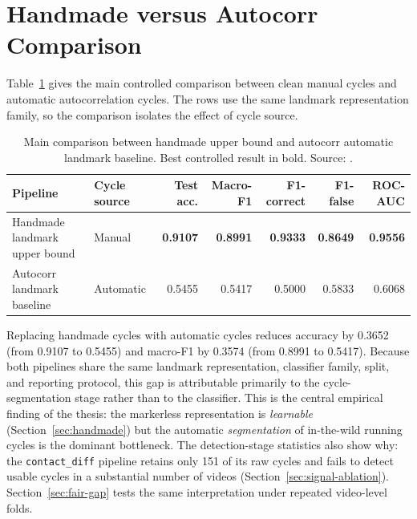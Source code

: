 \section{Handmade versus Autocorr Comparison}
\label{sec:hm-vs-ac}

Table~\ref{tab:hm-ac} gives the main controlled comparison between clean
manual cycles and automatic autocorrelation cycles. The rows use the same
landmark representation family, so the comparison isolates the effect of cycle
source.

\begin{table}[htbp]
\centering
\caption[Main comparison between handmade upper bound and autocorr baseline. Source: \protect{}.]{Main comparison between handmade upper bound and autocorr automatic landmark baseline. Best controlled result in bold. Source: .}
\label{tab:hm-ac}
\small
\begin{tabularx}{\textwidth}{X l r r r r r}
\toprule
\textbf{Pipeline} & \textbf{Cycle source} & \textbf{Test acc.} & \textbf{Macro-F1} & \textbf{F1-correct} & \textbf{F1-false} & \textbf{ROC-AUC} \\
\midrule
Handmade landmark upper bound & Manual & \textbf{0.9107} & \textbf{0.8991} & \textbf{0.9333} & \textbf{0.8649} & \textbf{0.9556} \\
\addlinespace
Autocorr landmark baseline & Automatic & 0.5455 & 0.5417 & 0.5000 & 0.5833 & 0.6068 \\
\bottomrule
\end{tabularx}
\end{table}

Replacing handmade cycles with automatic cycles reduces accuracy by
0.3652 (from 0.9107 to 0.5455) and macro-F1 by 0.3574 (from 0.8991 to 0.5417).
Because both pipelines share the same landmark representation, classifier
family, split, and reporting protocol, this gap is attributable primarily to
the cycle-segmentation stage rather than to the classifier. This is the
central empirical finding of the thesis: the markerless representation is
\emph{learnable} (Section~\ref{sec:handmade}) but the automatic
\emph{segmentation} of in-the-wild running cycles is the dominant bottleneck.
The detection-stage statistics also show why: the
\texttt{contact\_diff} pipeline retains only 151 of its raw cycles and fails
to detect usable cycles in a substantial number of videos
(Section~\ref{sec:signal-ablation}). Section~\ref{sec:fair-gap} tests the
same interpretation under repeated video-level folds.

